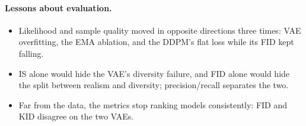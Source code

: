 \paragraph{Lessons about evaluation.}
\begin{itemize}
  \item Likelihood and sample quality moved in opposite directions three times: VAE overfitting, the EMA
        ablation, and the DDPM's flat loss while its FID kept falling.
  \item IS alone would hide the VAE's diversity failure, and FID alone would hide the split between realism and
        diversity; precision/recall separates the two.
  \item Far from the data, the metrics stop ranking models consistently: FID and KID disagree on the two VAEs.
\end{itemize}
